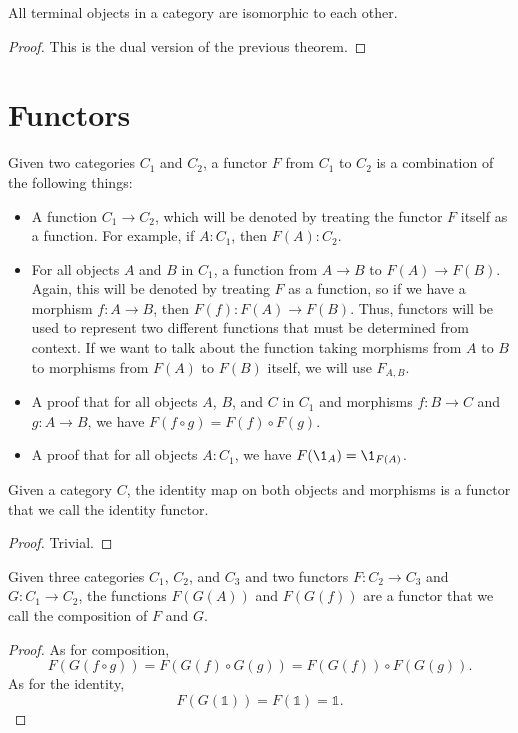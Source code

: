 \documentclass[../math.tex]{subfiles}
\begin{document}
\begin{theorem}
    All terminal objects in a category are isomorphic to each other.
\end{theorem}
\begin{proof}
    This is the dual version of the previous theorem.
\end{proof}

\section{Functors}

\begin{definition}
    Given two categories $C_1$ and $C_2$, a functor $F$ from $C_1$ to $C_2$ is a
    combination of the following things:
    \begin{itemize}
        \item A function $C_1 \to C_2$, which will be denoted by treating the
            functor $F$ itself as a function.  For example, if $A : C_1$, then
            $F(A) : C_2$.
        \item For all objects $A$ and $B$ in $C_1$, a function from $A \to B$ to
            $F(A) \to F(B)$.  Again, this will be denoted by treating $F$ as a
            function, so if we have a morphism $f : A \to B$, then $F(f) : F(A)
            \to F(B)$.  Thus, functors will be used to represent two different
            functions that must be determined from context.  If we want to talk
            about the function taking morphisms from $A$ to $B$ to morphisms
            from $F(A)$ to $F(B)$ itself, we will use $F_{A,B}$.
        \item A proof that for all objects $A$, $B$, and $C$ in $C_1$ and
            morphisms $f : B \to C$ and $g : A \to B$, we have $F(f \circ g) =
            F(f) \circ F(g)$.
        \item A proof that for all objects $A : C_1$, we have $F(\1_A) =
            \1_{F(A)}$.
    \end{itemize}
\end{definition}

\begin{theorem}
    Given a category $C$, the identity map on both objects and morphisms is a
    functor that we call the identity functor.
\end{theorem}
\begin{proof}
    Trivial.
\end{proof}

\begin{theorem}
    Given three categories $C_1$, $C_2$, and $C_3$ and two functors $F : C_2 \to
    C_3$ and $G : C_1 \to C_2$, the functions $F(G(A))$ and $F(G(f))$ are a
    functor that we call the composition of $F$ and $G$.
\end{theorem}
\begin{proof}
    As for composition,
    \[
        F(G(f \circ g)) = F(G(f) \circ G(g)) = F(G(f)) \circ F(G(g)).
    \]
    As for the identity,
    \[
        F(G(\mathds 1)) = F(\mathds 1) = \mathds 1.
    \]
\end{proof}
\end{document}
